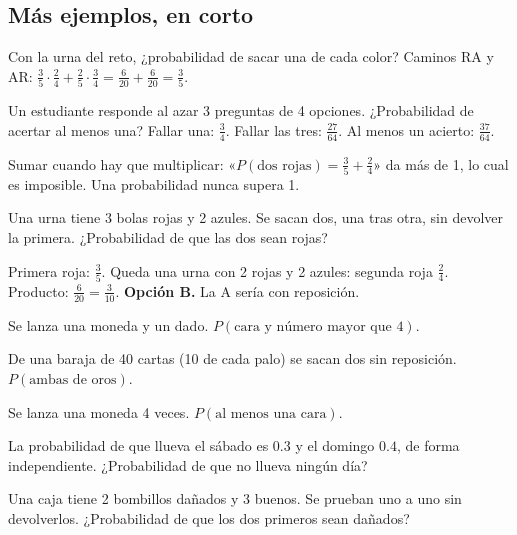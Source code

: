 \subsection{Más ejemplos, en corto}
\begin{ejemplo}
Con la urna del reto, ¿probabilidad de sacar una de cada color?
\solucion Caminos RA y AR: $\tfrac35 \cdot \tfrac24 + \tfrac25 \cdot \tfrac34 = \tfrac{6}{20} + \tfrac{6}{20} = \tfrac35$.
\end{ejemplo}

\begin{ejemplo}
Un estudiante responde al azar 3 preguntas de 4 opciones. ¿Probabilidad de acertar al menos una?
\solucion Fallar una: $\tfrac34$. Fallar las tres: $\tfrac{27}{64}$. Al menos un acierto: $\tfrac{37}{64}$.
\end{ejemplo}

\begin{trampa}
Sumar cuando hay que multiplicar: «$P(\text{dos rojas}) = \tfrac35 + \tfrac24$» da más de 1, lo cual es imposible. Una
probabilidad nunca supera 1.
\end{trampa}

\begin{reto}
Una urna tiene 3 bolas rojas y 2 azules. Se sacan dos, una tras otra, sin devolver la primera. ¿Probabilidad de que las
dos sean rojas?
\end{reto}

\begin{retoresuelto}
Primera roja: $\tfrac35$. Queda una urna con 2 rojas y 2 azules: segunda roja $\tfrac24$. Producto: $\tfrac{6}{20} =
\tfrac{3}{10}$. \textbf{Opción B.} La A sería con reposición.
\end{retoresuelto}

\taller
{}
\begin{ejercicios}
\item Se lanza una moneda y un dado. $P(\text{cara y número mayor que 4})$. 
\item De una baraja de 40 cartas (10 de cada palo) se sacan dos sin reposición. $P(\text{ambas de oros})$. 
\item Se lanza una moneda 4 veces. $P(\text{al menos una cara})$. 
\end{ejercicios}
\begin{ejercicios}
\item La probabilidad de que llueva el sábado es $0.3$ y el domingo $0.4$, de forma independiente. ¿Probabilidad de que no llueva ningún día?
\item Una caja tiene 2 bombillos dañados y 3 buenos. Se prueban uno a uno sin devolverlos. ¿Probabilidad de que los dos primeros sean dañados?
\end{ejercicios}

